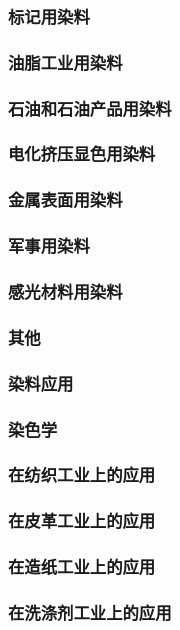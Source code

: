 \documentclass[UTF8]{../../ApplicationUniverse}
\begin{document}
        \subsubsection{标记用染料}
        \subsubsection{油脂工业用染料}
        \subsubsection{石油和石油产品用染料}
        \subsubsection{电化挤压显色用染料}
        \subsubsection{金属表面用染料}
        \subsubsection{军事用染料}
        \subsubsection{感光材料用染料}
        \subsubsection{其他}
\subsubsection{染料应用}
    \subsubsection{染色学}
    \subsubsection{在纺织工业上的应用}
    \subsubsection{在皮革工业上的应用}
    \subsubsection{在造纸工业上的应用}
    \subsubsection{在洗涤剂工业上的应用}
\end{document}
